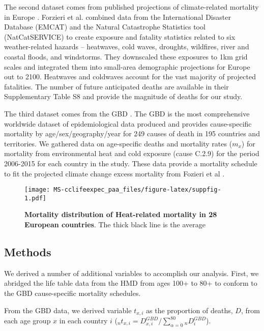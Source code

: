 \documentclass[12pt,]{article}
\makeatletter
\def\maxwidth{\ifdim\Gin@nat@width>\linewidth\linewidth
\else\Gin@nat@width\fi}
\let\Oldincludegraphics\includegraphics
\renewcommand{\includegraphics}[1]{\Oldincludegraphics[width=\maxwidth]{#1}}
\makeatother
\begin{document}
The second dataset comes from published projections of climate-related
mortality in Europe \citep{forzieri2017increasing}. Forzieri et al.
\citep{forzieri2017increasing} combined data from the International
Disaster Database (EMCAT) and the Natural Catastrophe Statistics tool
(NatCatSERVICE) to create exposure and fatality statistics related to
six weather-related hazards -- heatwaves, cold waves, droughts,
wildfires, river and coastal floods, and windstorms. They downscaled
these exposures to 1km grid scales and integrated them into small-area
demographic projections for Europe out to 2100. Heatwaves and coldwaves
account for the vast majority of projected fatalities. The number of
future anticipated deaths are available in their Supplementary Table S8
\citep{forzieri2017increasing} and provide the magnitude of deaths for
our study.

The third dataset comes from the GBD \citep{GBD, wang2012age}. The GBD
is the most comprehensive worldwide dataset of epidemiological data
produced and provides cause-specific mortality by age/sex/geography/year
for 249 causes of death in 195 countries and territories. We gathered
data on age-specific deaths and mortality rates (\(m_x\)) for mortality
from environmental heat and cold exposure (cause C.2.9) for the period
2006-2015 for each country in the study. These data provide a mortality
schedule to fit the projected climate change excess mortality from
Fozieri et al \citep{forzieri2017increasing}.

\begin{figure}
\centering
\texttt{[image: MS-cclifeexpec\_paa\_files/figure-latex/suppfig-1.pdf]}
\caption{\textbf{Mortality distribution of Heat-related mortality in 28
European countries}. The thick black line is the average\label{suppfig}}
\end{figure}

\subsection{Methods}\label{methods-2}

We derived a number of additional variables to accomplish our analysis.
First, we abridged the life table data from the HMD from ages 100+ to
80+ to conform to the GBD cause-specific mortality schedules.

From the GBD data, we derived variable \(t_{x,i}\) as the proportion of
deaths, \(D\), from each age group \(x\) in each country \(i\)
(\(_nt_{x,i}=D_{x,i}^{GBD}/\sum_{\alpha=0}^{80}{_nD_i^{GBD}}\)).
\end{document}

